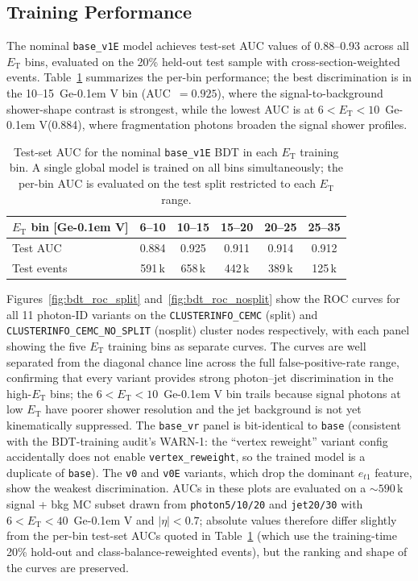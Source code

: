 \documentclass[11pt,a4paper]{article}
\newcommand{\ET}{\ensuremath{E_{\text{T}}}\xspace}
\newcommand{\GeV}{\ifmmode {\mathrm{\ Ge\kern -0.1em V}}\else\textrm{Ge\kern -0.1em V}\fi\xspace}
\begin{document}
\subsection{Training Performance}
\label{subsec:bdt_performance}

The nominal \texttt{base\_v1E} model achieves test-set AUC values of 0.88--0.93
across all \ET bins, evaluated on the 20\% held-out test sample with
cross-section-weighted events.  Table~\ref{tab:bdt_auc} summarizes the
per-bin performance; the best discrimination is in the 10--15~\GeV bin
(AUC~$= 0.925$), where the signal-to-background shower-shape contrast is
strongest, while the lowest AUC is at $6 < \ET < 10$~\GeV (0.884), where
fragmentation photons broaden the signal shower profiles.

\begin{table}[H]
    \centering
    \caption{Test-set AUC for the nominal \texttt{base\_v1E} BDT in each \ET
      training bin.  A single global model is trained on all bins simultaneously;
      the per-bin AUC is evaluated on the test split restricted to each \ET range.}
    \label{tab:bdt_auc}
    \begin{tabular}{lccccc}
        \toprule
        \ET bin [\GeV] & 6--10 & 10--15 & 15--20 & 20--25 & 25--35 \\
        \midrule
        Test AUC       & 0.884 & 0.925  & 0.911  & 0.914  & 0.912  \\
        Test events    & 591\,k & 658\,k & 442\,k & 389\,k & 125\,k \\
        \bottomrule
    \end{tabular}
\end{table}

Figures~\ref{fig:bdt_roc_split} and~\ref{fig:bdt_roc_nosplit} show the ROC
curves for all 11 photon-ID variants on the \texttt{CLUSTERINFO\_CEMC}
(split) and \texttt{CLUSTERINFO\_CEMC\_NO\_SPLIT} (nosplit) cluster nodes
respectively, with each panel showing the five \ET training bins as separate
curves.  The curves are well separated from the diagonal chance line across
the full false-positive-rate range, confirming that every variant provides
strong photon--jet discrimination in the high-\ET bins; the $6 < \ET <
10$~\GeV bin trails because signal photons at low \ET have poorer shower
resolution and the jet background is not yet kinematically suppressed.
The \texttt{base\_vr} panel is bit-identical to \texttt{base} (consistent with
the BDT-training audit's WARN-1: the ``vertex reweight'' variant config
accidentally does not enable \texttt{vertex\_reweight}, so the trained model
is a duplicate of \texttt{base}).  The \texttt{v0} and \texttt{v0E} variants,
which drop the dominant $e_{t1}$ feature, show the weakest discrimination.
AUCs in these plots are evaluated on a $\sim 590$\,k signal + bkg MC subset
drawn from \texttt{photon5/10/20} and \texttt{jet20/30} with $6 < \ET <
40$~\GeV and $|\eta| < 0.7$; absolute values therefore differ slightly from
the per-bin test-set AUCs quoted in Table~\ref{tab:bdt_auc} (which use the
training-time 20\% hold-out and class-balance-reweighted events), but the
ranking and shape of the curves are preserved.
\end{document}
